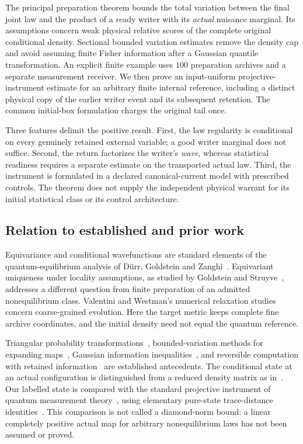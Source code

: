 \documentclass[11pt]{article}
\numberwithin{equation}{section}
\theoremstyle{definition}
\theoremstyle{remark}
\begin{document}
The principal preparation theorem bounds the total variation between the final joint law and the product of a ready writer with its \emph{actual} nuisance marginal. Its assumptions concern weak physical relative scores of the complete original conditional density. Sectional bounded variation estimates remove the density cap and avoid assuming finite Fisher information after a Gaussian quantile transformation. An explicit finite example uses $100$ preparation archives and a separate measurement receiver. We then prove an input-uniform projective-instrument estimate for an arbitrary finite internal reference, including a distinct physical copy of the earlier writer event and its subsequent retention. The common initial-box formulation charges the original tail once.

Three features delimit the positive result. First, the law regularity is conditional on every genuinely retained external variable; a good writer marginal does not suffice. Second, the return factorizes the writer's \emph{wave}, whereas statistical readiness requires a separate estimate on the transported actual law. Third, the instrument is formulated in a declared canonical-current model with prescribed controls. The theorem does not supply the independent physical warrant for its initial statistical class or its control architecture.

\subsection{Relation to established and prior work}\label{sec:literature}
Equivariance and conditional wavefunctions are standard elements of the quantum-equilibrium analysis of D\"urr, Goldstein and Zangh\`i~\cite{DurrGoldsteinZanghi1992,DurrGoldsteinZanghi2004}. Equivariant uniqueness under locality assumptions, as studied by Goldstein and Struyve~\cite{GoldsteinStruyve2007}, addresses a different question from finite preparation of an admitted nonequilibrium class. Valentini and Westman's numerical relaxation studies~\cite{ValentiniWestman2005} concern coarse-grained evolution. Here the target metric keeps complete fine archive coordinates, and the initial density need not equal the quantum reference.

Triangular probability transformations~\cite{Rosenblatt1952}, bounded-variation methods for expanding maps~\cite{LasotaYorke1973}, Gaussian information inequalities~\cite{Gross1975}, and reversible computation with retained information~\cite{Bennett1973} are established antecedents. The conditional state at an actual configuration is distinguished from a reduced density matrix as in~\cite{DurrEtAl2005Density}. Our labelled state is compared with the standard projective instrument of quantum measurement theory~\cite{DaviesLewis1970,Ozawa1984}, using elementary pure-state trace-distance identities~\cite{FuchsVanDeGraaf1999}. This comparison is not called a diamond-norm bound: a linear completely positive actual map for arbitrary nonequilibrium laws has not been assumed or proved.
\end{document}
